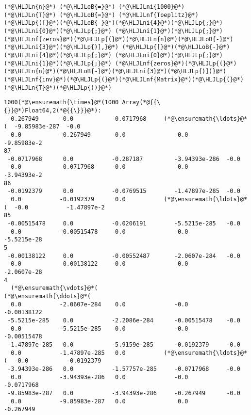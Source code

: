 \documentclass[12pt,a4paper]{article}
\newcommand{\HLJLn}[1]{#1}
\newcommand{\HLJLnf}[1]{\textcolor[RGB]{66,102,213}{#1}}
\newcommand{\HLJLni}[1]{\textcolor[RGB]{59,151,46}{#1}}
\newcommand{\HLJLoB}[1]{\textcolor[RGB]{102,102,102}{\textbf{#1}}}
\newcommand{\HLJLp}[1]{#1}
\begin{document}
\begin{lstlisting}
(*@\HLJLn{n}@*) (*@\HLJLoB{=}@*) (*@\HLJLni{1000}@*)
(*@\HLJLn{T}@*) (*@\HLJLoB{=}@*) (*@\HLJLnf{Toeplitz}@*)(*@\HLJLp{([}@*)(*@\HLJLoB{-}@*)(*@\HLJLni{4}@*)(*@\HLJLp{;}@*) (*@\HLJLni{0}@*)(*@\HLJLp{;}@*) (*@\HLJLni{1}@*)(*@\HLJLp{;}@*) (*@\HLJLnf{zeros}@*)(*@\HLJLp{(}@*)(*@\HLJLn{n}@*)(*@\HLJLoB{-}@*)(*@\HLJLni{3}@*)(*@\HLJLp{)],}@*) (*@\HLJLp{[}@*)(*@\HLJLoB{-}@*)(*@\HLJLni{4}@*)(*@\HLJLp{;}@*) (*@\HLJLni{0}@*)(*@\HLJLp{;}@*) (*@\HLJLni{1}@*)(*@\HLJLp{;}@*) (*@\HLJLnf{zeros}@*)(*@\HLJLp{(}@*)(*@\HLJLn{n}@*)(*@\HLJLoB{-}@*)(*@\HLJLni{3}@*)(*@\HLJLp{)])}@*)
(*@\HLJLnf{inv}@*)(*@\HLJLp{(}@*)(*@\HLJLnf{Matrix}@*)(*@\HLJLp{(}@*)(*@\HLJLn{T}@*)(*@\HLJLp{))}@*)
\end{lstlisting}

\begin{lstlisting}
1000(*@\ensuremath{\times}@*(1000 Array(*@{{\{}}@*)Float64,2(*@{{\}}}@*):
 -0.267949      -0.0           -0.0717968     (*@\ensuremath{\ldots}@*(  -9.85983e-287  -0.0
  0.0           -0.267949      -0.0              -0.0           -9.85983e-2
87
 -0.0717968      0.0           -0.287187         -3.94393e-286  -0.0
  0.0           -0.0717968      0.0              -0.0           -3.94393e-2
86
 -0.0192379      0.0           -0.0769515        -1.47897e-285  -0.0
  0.0           -0.0192379      0.0           (*@\ensuremath{\ldots}@*(  -0.0           -1.47897e-2
85
 -0.00515478     0.0           -0.0206191        -5.5215e-285   -0.0
  0.0           -0.00515478     0.0              -0.0           -5.5215e-28
5
 -0.00138122     0.0           -0.00552487       -2.0607e-284   -0.0
  0.0           -0.00138122     0.0              -0.0           -2.0607e-28
4
  (*@\ensuremath{\vdots}@*(                                           (*@\ensuremath{\ddots}@*(                 
  0.0           -2.0607e-284    0.0              -0.0           -0.00138122
 -5.5215e-285    0.0           -2.2086e-284      -0.00515478    -0.0
  0.0           -5.5215e-285    0.0              -0.0           -0.00515478
 -1.47897e-285   0.0           -5.9159e-285      -0.0192379     -0.0
  0.0           -1.47897e-285   0.0           (*@\ensuremath{\ldots}@*(  -0.0           -0.0192379
 -3.94393e-286   0.0           -1.57757e-285     -0.0717968     -0.0
  0.0           -3.94393e-286   0.0              -0.0           -0.0717968
 -9.85983e-287   0.0           -3.94393e-286     -0.267949      -0.0
  0.0           -9.85983e-287   0.0               0.0           -0.267949
\end{lstlisting}
\end{document}

